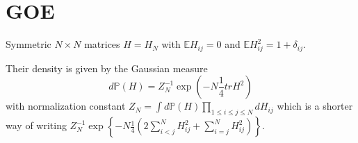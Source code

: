 \section{GOE}
\begin{definition}\label{def:GOE}
	Symmetric $N\times N$ matrices $H=H_N$ with $\mathbb E H_{ij}=0$ and $\mathbb E H_{ij}^2=1+\delta_{ij}$.
\end{definition}
\begin{remark}
	Their density is given by the Gaussian measure
	\begin{equation}
		d\mathbb P(H)=Z_N^{-1}\exp\left(-N\frac{1}{4}tr H^2\right)
	\end{equation}
	with normalization constant $Z_N=\int d\mathbb P(H)\prod_{1\leq i\leq j\leq N} dH_{ij}$ which is a shorter way of writing $Z_N^{-1}\exp\left\{-N\frac{1}{4}\left(2\sum_{i<j}^N H_{ij}^2+\sum_{i=j}^N H_{ij}^2\right)\right\}$.
\end{remark}

